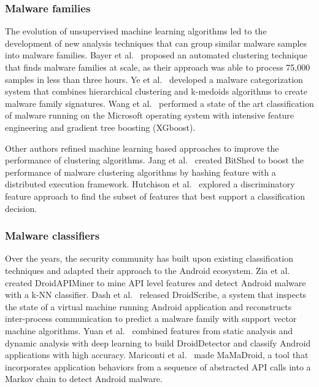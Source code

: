 \subsubsection{Malware families}
The evolution of unsupervised machine learning algorithms led to the development of new analysis techniques that can group similar malware samples into malware families.
Bayer et al.~\cite{bayer_scalable_2009} proposed an automated clustering technique that finds malware families at scale, as their approach was able to process 75,000 samples in less than three hours.
Ye et al.~\cite{ye_automatic_2010} developed a malware categorization system that combines hierarchical clustering and k-medoids algorithms to create malware family signatures.
Wang et al.~\cite{wang_microsoft_2015} performed a state of the art classification of malware running on the Microsoft operating system with intensive feature engineering and gradient tree boosting (XGboost).

Other authors refined machine learning based approaches to improve the performance of clustering algorithms.
Jang et al.~\cite{jang_bitshred:_2011} created BitShed to boost the performance of malware clustering algorithms by hashing feature with a distributed execution framework.
Hutchison et al.~\cite{hutchison_exploring_2013} explored a discriminatory feature approach to find the subset of features that best support a classification decision.
\subsubsection{Malware classifiers}
Over the years, the security community has built upon existing classification techniques and adapted their approach to the Android ecosystem.
Zia et al.~\cite{zia_droidapiminer:_2013} created DroidAPIMiner to mine API level features and detect Android malware with a k-NN classifier.
Dash et al.~\cite{dash_droidscribe:_2016} released DroidScribe, a system that inspects the state of a virtual machine running Android application and reconstructs inter-process communication to predict a malware family with support vector machine algorithms.
Yuan et al.~\cite{yuan_droiddetector:_2016} combined features from static analysis and dynamic analysis with deep learning to build DroidDetector and classify Android applications with high accuracy.
Mariconti et al.~\cite{mariconti_mamadroid:_2017} made MaMaDroid, a tool that incorporates application behaviors from a sequence of abstracted API calls into a Markov chain to detect Android malware.


